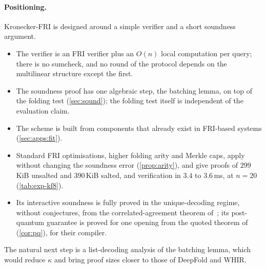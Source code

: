 \paragraph{Positioning.}
Kronecker-FRI is designed around a simple verifier and a short soundness argument.
\begin{itemize}
  \item The verifier is an FRI verifier plus an $O(n)$ local computation per query; there is no sumcheck, and no round of the protocol depends on the multilinear structure except the first.
  \item The soundness proof has one algebraic step, the batching lemma, on top of the folding test (\cref{sec:sound}); the folding test itself is independent of the evaluation claim.
  \item The scheme is built from components that already exist in FRI-based systems (\cref{sec:apps:fit}).
  \item Standard FRI optimisations, higher folding arity and Merkle caps, apply without changing the soundness error (\cref{prop:arity}), and give proofs of $299$\,KiB unsalted and $390$\,KiB salted, and verification in $3.4$ to $3.6$\,ms, at $n = 20$ (\cref{tab:exp-kf8}).
  \item Its interactive soundness is fully proved in the unique-decoding regime, without conjectures, from the correlated-agreement theorem of~\cite{BCIKS23}; its post-quantum guarantee is proved for one opening from the quoted theorem of~\cite{CDHZ25} (\cref{cor:pq}), for their compiler.
\end{itemize}
The natural next step is a list-decoding analysis of the batching lemma, which would reduce $\kappa$ and bring proof sizes closer to those of DeepFold and WHIR.
